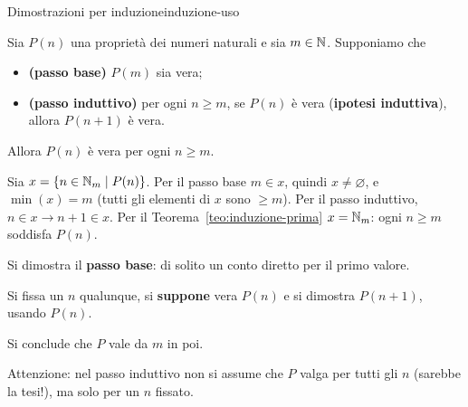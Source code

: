 \begin{concetto}
\begin{Corollario}{Dimostrazioni per induzione}{induzione-uso}
    \begin{prerequisiti}
    \end{prerequisiti}
    Sia $P(n)$ una proprietà dei numeri naturali e sia $m \in \mathbb{N}$. Supponiamo che
    \begin{itemize}
        \item[] \textbf{(passo base)} $P(m)$ sia vera;
        \item[] \textbf{(passo induttivo)} per ogni $n \geq m$, se $P(n)$ è vera (\textbf{ipotesi induttiva}), allora $P(n + 1)$ è vera.
    \end{itemize}
    Allora $P(n)$ è vera per ogni $n \geq m$.
\end{Corollario}
\begin{dimostrazione}
    Sia $x = \{n \in \mathbb{N}_m \mid P(n)\}$. Per il passo base $m \in x$, quindi $x \neq \varnothing$, e $\min(x) = m$ (tutti gli elementi
    di $x$ sono $\geq m$). Per il passo induttivo, $n \in x \rightarrow n + 1 \in x$. Per il Teorema~\ref{teo:induzione-prima}
    $x = \mathbb{N}_m$: ogni $n \geq m$ soddisfa $P(n)$.
\end{dimostrazione}
\end{concetto}

\begin{spiegazione}
    \begin{passi}
        \item Si dimostra il \textbf{passo base}: di solito un conto diretto per il primo valore.
        \item Si fissa un $n$ qualunque, si \textbf{suppone} vera $P(n)$ e si dimostra $P(n + 1)$, usando $P(n)$.
        \item Si conclude che $P$ vale da $m$ in poi.
    \end{passi}
    Attenzione: nel passo induttivo non si assume che $P$ valga per tutti gli $n$ (sarebbe la tesi!), ma solo per un $n$ fissato.
\end{spiegazione}

